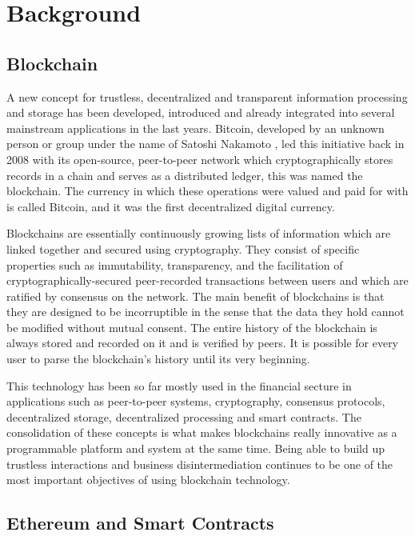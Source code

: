 \section{Background}

\subsection{Blockchain}

A new concept for trustless, decentralized and transparent information processing and storage has been developed, introduced and already integrated into several mainstream applications in the last years. Bitcoin, developed by an unknown person or group under the name of Satoshi Nakamoto \cite{nakamoto2008bitcoin}, led this initiative back in 2008 with its open-source, peer-to-peer network which cryptographically stores records in a chain and serves as a distributed ledger, this was named the blockchain. The currency in which these operations were valued and paid for with is called Bitcoin, and it was the first decentralized digital currency.

Blockchains are essentially continuously growing lists of information which are linked together and secured using cryptography. They consist of specific properties such as immutability, transparency, and the facilitation of cryptographically-secured peer-recorded transactions between users and  which are ratified by consensus on the network.
The main benefit of blockchains is that they are designed to be incorruptible in the sense that the data they hold cannot be modified without mutual consent. The entire history of the blockchain is always stored and recorded on it and is verified by peers. It is possible for every user to parse the blockchain's history until its very beginning.

This technology has been so far mostly used in the financial secture in applications such as peer-to-peer systems, cryptography, consensus protocols, decentralized storage, decentralized processing and smart contracts. The consolidation of these concepts is what makes blockchains really innovative as a programmable platform and system at the same time.
Being able to build up trustless interactions and business disintermediation continues to be one of the most important objectives of using blockchain technology.

\subsection{Ethereum and Smart Contracts}

